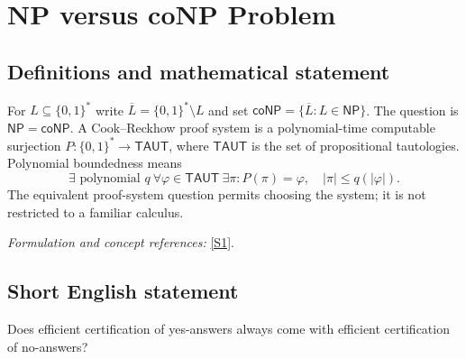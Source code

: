 \documentclass[11pt]{article}
\begin{document}
\section*{\texorpdfstring{NP versus coNP Problem}{NP versus coNP Problem}}\label{13}
\subsection{Definitions and mathematical statement}
For $L\subseteq\{0,1\}^*$ write $\overline L=\{0,1\}^*\setminus L$ and set $\mathsf{coNP}=\{\overline L:L\in\mathsf{NP}\}$. The question is $\mathsf{NP}=\mathsf{coNP}$. A Cook--Reckhow proof system is a polynomial-time computable surjection $P:\{0,1\}^*\to\mathsf{TAUT}$, where $\mathsf{TAUT}$ is the set of propositional tautologies. Polynomial boundedness means
\[
 \exists\text{ polynomial }q\ \forall\varphi\in\mathsf{TAUT}\ \exists\pi:
 P(\pi)=\varphi,\quad|\pi|\le q(|\varphi|).
\]
The equivalent proof-system question permits choosing the system; it is not restricted to a familiar calculus.
\par\smallskip\textit{Formulation and concept references:} \href{https://www.scottaaronson.com/papers/pnp.pdf}{[S1]}.

\subsection{Short English statement}
Does efficient certification of yes-answers always come with efficient certification of no-answers?
\end{document}
